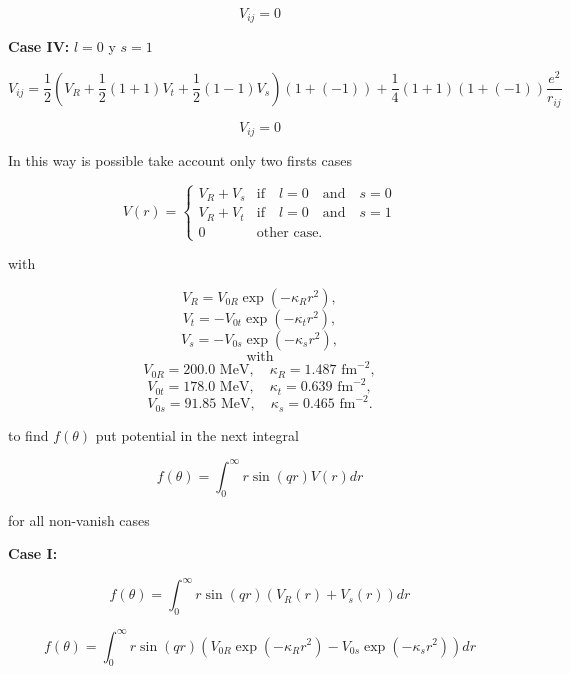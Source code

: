 \documentclass{article}
\begin{document}
\begin{equation}
    V_{ij} = 0
\end{equation}

\textbf{Case IV:} $l=0$ y $s=1$

\begin{equation}
    V_{ij} = \frac{1}{2}(V_{R} + \frac{1}{2}(1 + 1)V_{t} + \frac{1}{2}(1 - 1)V_{s})(1 + (-1)) + \frac{1}{4}(1 + 1)(1 + (-1))\frac{e^{2}}{r_{ij}}
\end{equation}

\begin{equation}
    V_{ij} = 0
\end{equation}

In this way is possible take account only two firsts cases

\begin{equation}
    V(r) =
    \begin{cases}
        V_R + V_s & \text{if} \quad l=0 \quad \text{and} \quad s=0\\
        V_R + V_t & \text{if} \quad l=0 \quad \text{and} \quad s=1\\
        0 & \text{other case.}
    \end{cases}
\end{equation}

with

\[
V_R = V_{0R} \exp(-\kappa_R r^2),
\]
\[
V_t = -V_{0t} \exp(-\kappa_t r^2),
\]
\[
V_s = -V_{0s} \exp(-\kappa_s r^2),
\]
\[
\text{with}
\]
\[
V_{0R} = 200.0 \text{ MeV}, \quad \kappa_{R} = 1.487 \text{ fm}^{-2},
\]
\[
V_{0t} = 178.0 \text{ MeV}, \quad \kappa_{t} = 0.639 \text{ fm}^{-2},
\]
\[
V_{0s} = 91.85 \text{ MeV}, \quad \kappa_{s} = 0.465 \text{ fm}^{-2}.
\]

to find $f(\theta)$ put potential in the next integral

\begin{equation}
    f(\theta) = \int_0^{\infty} r\sin{(qr)}V(r)dr
\end{equation}

for all non-vanish cases

\textbf{Case I:}

\begin{equation}
    f(\theta) = \int_0^{\infty} r\sin{(qr)}(V_R(r) + V_s(r))dr
\end{equation}

\begin{equation}
    f(\theta) = \int_0^{\infty} r\sin{(qr)}\left(V_{0R} \exp(-\kappa_R r^2) - V_{0s} \exp(-\kappa_s r^2)\right)dr
\end{equation}
\end{document}
